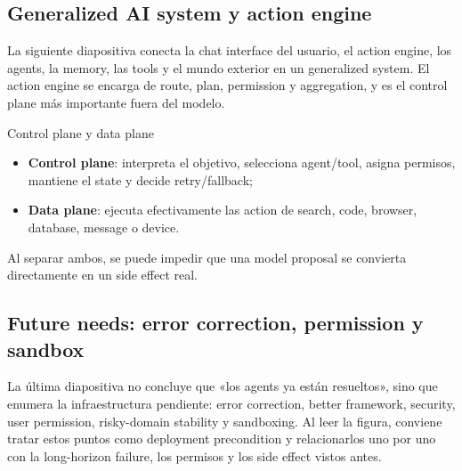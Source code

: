 \subsection{Generalized AI system y action engine}

La siguiente diapositiva conecta la chat interface del usuario, el action engine, los agents, la memory, las tools y el mundo exterior en un generalized system. El action engine se encarga de route, plan, permission y aggregation, y es el control plane más importante fuera del modelo.



\begin{importantbox}{Control plane y data plane}
\begin{itemize}
  \item \textbf{Control plane}: interpreta el objetivo, selecciona agent/tool, asigna permisos, mantiene el state y decide retry/fallback;
  \item \textbf{Data plane}: ejecuta efectivamente las action de search, code, browser, database, message o device.
\end{itemize}
Al separar ambos, se puede impedir que una model proposal se convierta directamente en un side effect real.
\end{importantbox}

\subsection{Future needs: error correction, permission y sandbox}

La última diapositiva no concluye que «los agents ya están resueltos», sino que enumera la infraestructura pendiente: error correction, better framework, security, user permission, risky-domain stability y sandboxing. Al leer la figura, conviene tratar estos puntos como deployment precondition y relacionarlos uno por uno con la long-horizon failure, los permisos y los side effect vistos antes.


